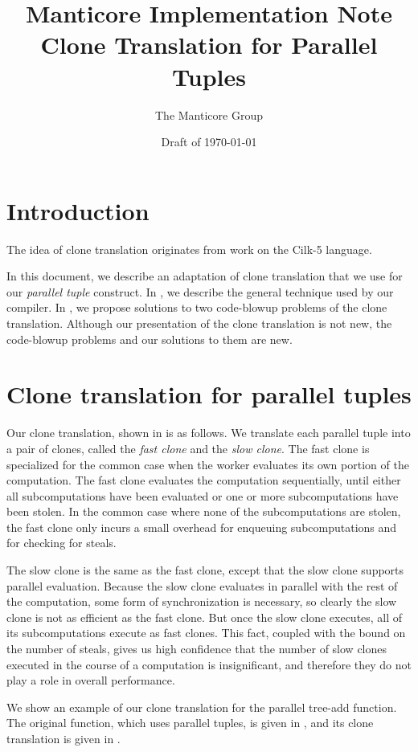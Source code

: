 \documentclass[11pt]{article}
\title{Manticore Implementation Note \\ Clone Translation for Parallel Tuples}
\author{The Manticore Group}
\date{Draft of \today}
\begin{document}
\maketitle

\section{Introduction}
The idea of clone translation originates from work on the Cilk-5 language.

In this document, we describe an adaptation of clone translation that we use for
our \emph{parallel tuple} construct.
In , we describe the general technique used by 
our compiler.
In , we propose solutions to two code-blowup 
problems of the clone translation.
Although our presentation of the clone translation is not new, the code-blowup
problems and our solutions to them are new.

\section{Clone translation for parallel tuples}
\label{sec:clone-translation}

Our clone translation, shown in  is as follows.  We translate each parallel
tuple into a pair of clones, called the \emph{fast clone} and the
\emph{slow clone}.  The fast clone is specialized for the common case when
the worker evaluates its own portion of the computation.  The fast
clone evaluates the computation sequentially, until either all
subcomputations have been evaluated or one or more subcomputations
have been stolen.  In the common case where none of the
subcomputations are stolen, the fast clone only incurs a small
overhead for enqueuing subcomputations and for checking for steals.

The slow clone is the same as the fast clone, except that the slow
clone supports parallel evaluation.  Because the slow clone evaluates
in parallel with the rest of the computation, some form of synchronization
is necessary, so clearly the slow clone is not as efficient as the fast 
clone.  But once the slow clone executes, all of its subcomputations execute 
as fast clones. This fact, coupled with the bound on the number of steals, 
gives us high confidence that the number of slow clones executed in the course of
a computation is insignificant, and therefore they do not play a
role in overall performance.

We show an example of our clone translation for the parallel tree-add function.
The original function, which uses parallel tuples, is given in ,
and its clone translation is given in .
\end{document}
